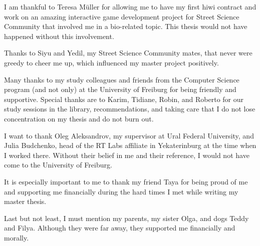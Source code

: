 I am thankful to Teresa Müller for allowing me to have my first hiwi contract and work on an amazing interactive game development project for Street Science Community that involved me in a bio-related topic. This thesis would not have happened without this involvement.

Thanks to Siyu and Yedil, my Street Science Community mates, that never were greedy to cheer me up, which influenced my master project positively.

Many thanks to my study colleagues and friends from the Computer Science program (and not only) at the University of Freiburg for being friendly and supportive. Special thanks are to Karim, Tidiane, Robin, and Roberto for our study sessions in the library, recommendations, and taking care that I do not lose concentration on my thesis and do not burn out.

I want to thank Oleg Aleksandrov, my supervisor at Ural Federal University, and Julia Budchenko, head of the RT Labs affiliate in Yekaterinburg at the time when I worked there. Without their belief in me and their reference, I would not have come to the University of Freiburg.

It is especially important to me to thank my friend Taya for being proud of me and supporting me financially during the hard times I met while writing my master thesis.

Last but not least, I must mention my parents, my sister Olga, and dogs Teddy and Filya. Although they were far away, they supported me financially and morally.